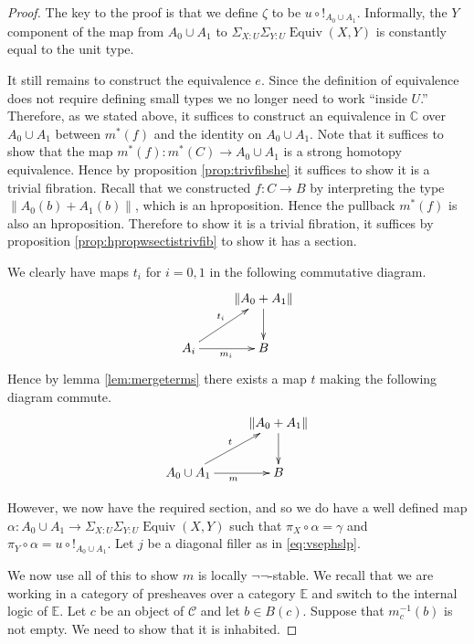 \documentclass[a4paper]{amsart}
\theoremstyle{definition}
\newcommand{\cat}[1]{\mathbb{#1}}
\newcommand{\catc}{\cat{C}}
\newcommand{\smcat}[1]{\mathcal{#1}}
\newcommand{\hequiv}{\operatorname{Equiv}}
\begin{document}
\begin{proof}
  The key to the proof is that we define $\zeta$ to be
  $u \circ !_{A_0 \cup A_1}$. Informally, the $Y$ component of the map
  from $A_0 \cup A_1$ to $\Sigma_{X : U} \Sigma_{Y : U} \hequiv(X, Y)$
  is constantly equal to the unit type.

  It still remains to construct the equivalence $e$. Since the
  definition of equivalence does not require defining small types we
  no longer need to work ``inside $U$.'' Therefore, as we stated
  above, it suffices to construct an equivalence in $\catc$ over
  $A_0 \cup A_1$ between $m^\ast(f)$ and the identity on
  $A_0 \cup A_1$. Note that it suffices to show that the map
  $m^\ast(f) \colon m^\ast(C) \to A_0 \cup A_1$ is a
  strong homotopy equivalence. Hence
  by proposition \ref{prop:trivfibshe} it suffices to show it is a
  trivial fibration. Recall that we constructed $f \colon C \to B$
  by interpreting
  the type $\| A_0(b) + A_1(b) \|$, which is an hproposition. Hence the
  pullback $m^\ast(f)$ is also an hproposition. Therefore to show it
  is a trivial fibration, it suffices by proposition
  \ref{prop:hpropwsectistrivfib} to show it has a section.
  
  We clearly have maps $t_i$ for $i = 0,1$ in the following commutative
  diagram.
  \begin{equation*}
    \xymatrix{ & \| A_0 + A_1 \| \ar[d] \\
      A_i \ar[ur]^{t_i} \ar[r]_{m_i} & B
    }
  \end{equation*}
  Hence by lemma \ref{lem:mergeterms} there exists a map $t$ making the
  following diagram commute.
  \begin{equation*}
    \xymatrix{ & \| A_0 + A_1 \| \ar[d] \\
      A_0 \cup A_1 \ar[ur]^{t} \ar[r]_{m} & B
    }    
  \end{equation*}

  However, we now have the required section, and so we do have a well
  defined map
  $\alpha \colon A_0 \cup A_1 \to \Sigma_{X : U} \Sigma_{Y : U}
  \hequiv(X, Y)$ such that $\pi_X \circ \alpha = \gamma$ and
  $\pi_Y \circ \alpha = u \circ !_{A_0 \cup A_1}$. Let
  $j$ be a diagonal filler as in \eqref{eq:vsephslp}.

  We now use all of this to show $m$ is locally $\neg \neg$-stable. We
  recall that we are working in a category of presheaves over a
  category $\cat{E}$ and switch to the internal logic of
  $\cat{E}$. Let $c$ be an object of $\smcat{C}$ and let $b \in
  B(c)$. Suppose that $m_c^{-1}(b)$ is not empty. We need to show that
  it is inhabited.


\end{proof}
\end{document}
